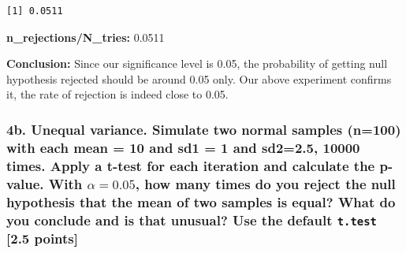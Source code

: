 \documentclass[
  letterpaper,
  DIV=11,
  numbers=noendperiod]{scrartcl}
\begin{document}
\begin{verbatim}
[1] 0.0511
\end{verbatim}

\textbf{n\_rejections/N\_tries:} 0.0511

\textbf{Conclusion:} Since our significance level is 0.05, the
probability of getting null hypothesis rejected should be around 0.05
only. Our above experiment confirms it, the rate of rejection is indeed
close to 0.05.

\subsubsection{\texorpdfstring{4b. \textbf{Unequal variance}. Simulate
two normal samples (n=100) with each mean = 10 and sd1 = 1 and sd2=2.5,
10000 times. Apply a t-test for each iteration and calculate the
p-value. With \(\alpha=0.05\), how many times do you reject the null
hypothesis that the mean of two samples is equal? What do you conclude
and is that unusual? Use the default \texttt{t.test} {[}2.5
points{]}}{4b. Unequal variance. Simulate two normal samples (n=100) with each mean = 10 and sd1 = 1 and sd2=2.5, 10000 times. Apply a t-test for each iteration and calculate the p-value. With \textbackslash alpha=0.05, how many times do you reject the null hypothesis that the mean of two samples is equal? What do you conclude and is that unusual? Use the default t.test {[}2.5 points{]}}}\label{b.-unequal-variance.-simulate-two-normal-samples-n100-with-each-mean-10-and-sd1-1-and-sd22.5-10000-times.-apply-a-t-test-for-each-iteration-and-calculate-the-p-value.-with-alpha0.05-how-many-times-do-you-reject-the-null-hypothesis-that-the-mean-of-two-samples-is-equal-what-do-you-conclude-and-is-that-unusual-use-the-default-t.test-2.5-points}
\end{document}
